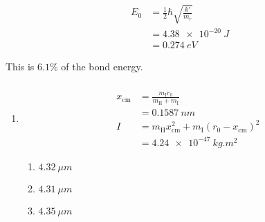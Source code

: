 \documentclass{article}
\begin{document}
\begin{align*}
  E_0 & = \frac{1}{2} \hbar \sqrt{\frac{k'}{m_r}} \\
      & = \qty{4.38e-20}{J}                       \\
      & = \qty{0.274}{eV}
\end{align*}

This is $6.1\%$ of the bond energy.

\setcounter{subsubsection}{44}
\subsubsection{}

\begin{enumerate}
  \item

        \begin{align*}
          x_\text{cm} & = \frac{m_\text{I} r_0}{m_\text{H} + m_\text{I}}              \\
                      & = \qty{0.1587}{nm}                                            \\
          I           & = m_\text{H} x_\text{cm}^2 + m_\text{I} (r_0 - x_\text{cm})^2 \\
                      & = \qty{4.24e-47}{kg.m^2}
        \end{align*}

        \begin{enumerate}
          \item $\qty{4.32}{\mu m}$

          \item $\qty{4.31}{\mu m}$

          \item $\qty{4.35}{\mu m}$
        \end{enumerate}
\end{enumerate}

\setcounter{subsubsection}{46}
\subsubsection{}
\end{document}
